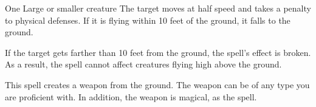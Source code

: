 \begin{comment}
\subsubsection{E}
\end{comment}

\begin{spellheader}
    \spellrng{\rngmed}
    \spelldur{\durshort}
\end{spellheader}
\begin{spelleffects}
    \begin{spelltarget}{One Large or smaller creature}
        \spelleffect The target moves at half speed and takes a  penalty to physical defenses. If it is flying within 10 feet of the ground, it falls to the ground.
    \end{spelltarget}
\end{spelleffects}
\begin{spellfooter}
    \spellnotes If the target gets farther than 10 feet from the ground, the spell's effect is broken. As a result, the spell cannot affect creatures flying high above the ground.
\end{spellfooter}

\begin{spellheader}
    \spelldur{\durlong \dismissable}
\end{spellheader}
\begin{spelleffects}
    \spelleffect This spell creates a weapon from the ground. The weapon can be of any type you are proficient with. In addition, the weapon is magical, as the  spell.
\end{spelleffects}
\begin{spellfooter}
    
\end{spellfooter}

